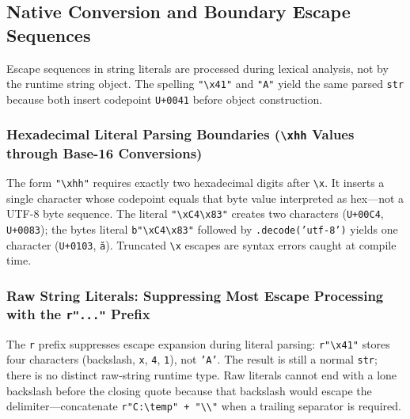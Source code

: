 \subsection{Native Conversion and Boundary Escape Sequences}

Escape sequences in string literals are processed during lexical analysis, not by the runtime string object. The spelling \texttt{"\textbackslash x41"} and \texttt{"A"} yield the same parsed \texttt{str} because both insert codepoint \texttt{U+0041} before object construction.

\subsubsection{Hexadecimal Literal Parsing Boundaries (\texttt{\textbackslash xhh} Values through Base-16 Conversions)}

The form \texttt{"\textbackslash xhh"} requires exactly two hexadecimal digits after \texttt{\textbackslash x}. It inserts a single character whose codepoint equals that byte value interpreted as hex---not a UTF-8 byte sequence. The literal \texttt{"\textbackslash xC4\textbackslash x83"} creates two characters (\texttt{U+00C4}, \texttt{U+0083}); the bytes literal \texttt{b"\textbackslash xC4\textbackslash x83"} followed by \texttt{.decode('utf-8')} yields one character (\texttt{U+0103}, \texttt{ă}). Truncated \texttt{\textbackslash x} escapes are syntax errors caught at compile time.

\subsubsection{Raw String Literals: Suppressing Most Escape Processing with the \texttt{r"..."} Prefix}

The \texttt{r} prefix suppresses escape expansion during literal parsing: \texttt{r"\textbackslash x41"} stores four characters (backslash, \texttt{x}, \texttt{4}, \texttt{1}), not \texttt{'A'}. The result is still a normal \texttt{str}; there is no distinct raw-string runtime type. Raw literals cannot end with a lone backslash before the closing quote because that backslash would escape the delimiter---concatenate \texttt{r"C:\textbackslash temp" + "\textbackslash\textbackslash"} when a trailing separator is required.
